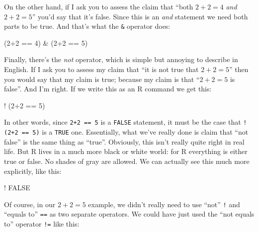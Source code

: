 \documentclass[
]{book}
\newenvironment{Shaded}{\begin{snugshade}}{\end{snugshade}}
\newcommand{\ConstantTok}[1]{\textcolor[rgb]{0.00,0.00,0.00}{#1}}
\newcommand{\DecValTok}[1]{\textcolor[rgb]{0.00,0.00,0.81}{#1}}
\newcommand{\NormalTok}[1]{#1}
\newcommand{\SpecialCharTok}[1]{\textcolor[rgb]{0.00,0.00,0.00}{#1}}
\begin{document}
On the other hand, if I ask you to assess the claim that ``both \(2+2 = 4\) \emph{and} \(2+2 = 5\)'' you'd say that it's false. Since this is an \emph{and} statement we need both parts to be true. And that's what the \texttt{\&} operator does:

\begin{Shaded}
\begin{Highlighting}[]
\NormalTok{(}\DecValTok{2}\SpecialCharTok{+}\DecValTok{2} \SpecialCharTok{==} \DecValTok{4}\NormalTok{) }\SpecialCharTok{\&}\NormalTok{ (}\DecValTok{2}\SpecialCharTok{+}\DecValTok{2} \SpecialCharTok{==} \DecValTok{5}\NormalTok{)}
\end{Highlighting}
\end{Shaded}

Finally, there's the \emph{not} operator, which is simple but annoying to describe in English. If I ask you to assess my claim that ``it is not true that \(2+2 = 5\)'' then you would say that my claim is true; because my claim is that ``\(2+2 = 5\) is false''. And I'm right. If we write this as an R command we get this:

\begin{Shaded}
\begin{Highlighting}[]
\SpecialCharTok{!}\NormalTok{ (}\DecValTok{2}\SpecialCharTok{+}\DecValTok{2} \SpecialCharTok{==} \DecValTok{5}\NormalTok{)}
\end{Highlighting}
\end{Shaded}

In other words, since \texttt{2+2\ ==\ 5} is a \texttt{FALSE} statement, it must be the case that \texttt{!(2+2\ ==\ 5)} is a \texttt{TRUE} one. Essentially, what we've really done is claim that ``not false'' is the same thing as ``true''. Obviously, this isn't really quite right in real life. But R lives in a much more black or white world: for R everything is either true or false. No shades of gray are allowed. We can actually see this much more explicitly, like this:

\begin{Shaded}
\begin{Highlighting}[]
\SpecialCharTok{!} \ConstantTok{FALSE}
\end{Highlighting}
\end{Shaded}

Of course, in our \(2+2 = 5\) example, we didn't really need to use ``not'' \texttt{!} and ``equals to'' \texttt{==} as two separate operators. We could have just used the ``not equals to'' operator \texttt{!=} like this:
\end{document}
